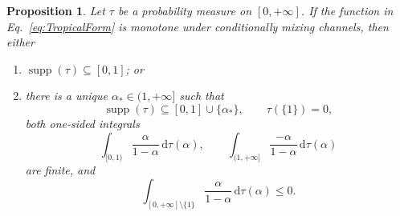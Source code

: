 \documentclass[aps,pra,11pt,onecolumn,nofootinbib,tightenlines]{revtex4-2}
\newtheorem{proposition}[theorem]{Proposition}
\theoremstyle{definition}
\def\d{\mathrm{d}}
\begin{document}
\begin{proposition}
\label{prop:negative-tropical-necessary}
Let $\tau$ be a probability measure on $[0,+\infty]$.  If the function in
Eq.~\eqref{eq:TropicalForm} is monotone under conditionally mixing channels,
then either
\begin{enumerate}[label=(\alph*)]
\item $\operatorname{supp}(\tau)\subseteq[0,1]$; or
\item there is a unique $\alpha_*\in(1,+\infty]$ such that
\[
\operatorname{supp}(\tau)\subseteq[0,1]\cup\{\alpha_*\},
\qquad \tau(\{1\})=0,
\]
both one-sided integrals
\[
\int_{[0,1)}\frac{\alpha}{1-\alpha}\,\d\tau(\alpha),
\qquad
\int_{(1,+\infty]}\frac{-\alpha}{1-\alpha}\,\d\tau(\alpha)
\]
are finite, and
\begin{equation}
\label{eq:negative-tropical-necessary-moment}
\int_{[0,+\infty]\setminus\{1\}}
\frac{\alpha}{1-\alpha}\,\d\tau(\alpha)\leq0.
\end{equation}
\end{enumerate}
\end{proposition}
\end{document}
